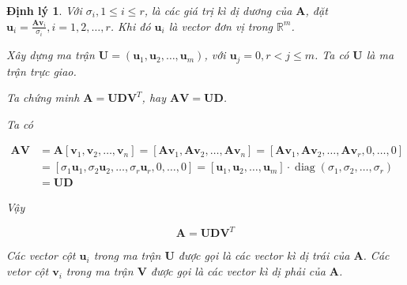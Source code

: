 \documentclass[12pt,a4paper,oneside]{report}
\newtheorem{dl}{Định lý}[section]
\numberwithin{equation}{section}
\begin{document}
\begin{dl}
Với $\sigma_{i}, 1 \leqslant i \leqslant r$, là các giá trị kì dị dương của $\mathbf{A}$, đặt $\mathbf{u}_{i}=\frac{\mathbf{A v}_{i}}{\sigma_{i}}, i=1,2, \ldots, r$. Khi đó $\mathbf{u}_{i}$ là vector đơn vị trong $\mathbb{R}^{m}$.

Xây dựng ma trận $\mathbf{U}=\left(\mathbf{u}_{1}, \mathbf{u}_{2}, \ldots, \mathbf{u}_{m}\right)$, với $\mathbf{u}_{j}=0, r<j \leqslant m$. Ta có $\mathbf{U}$ là ma trận trực giao.

Ta chứng minh $\mathbf{A}=\mathbf{U D V}^{T}$, hay $\mathbf{A V}=\mathbf{U D}$.

Ta có

$$
\begin{aligned}
	\mathbf{A} \mathbf{V} & =\mathbf{A}\left[\mathbf{v}_{1}, \mathbf{v}_{2}, \ldots, \mathbf{v}_{n}\right]=\left[\mathbf{A v}_{1}, \mathbf{A v}_{2}, \ldots, \mathbf{A} \mathbf{v}_{n}\right]=\left[\mathbf{A v}_{1}, \mathbf{A v}_{2}, \ldots, \mathbf{A v}_{r}, 0, \ldots, 0\right] \\
	& =\left[\sigma_{1} \mathbf{u}_{1}, \sigma_{2} \mathbf{u}_{2}, \ldots, \sigma_{r} \mathbf{u}_{r}, 0, \ldots, 0\right]=\left[\mathbf{u}_{1}, \mathbf{u}_{2}, \ldots, \mathbf{u}_{m}\right] \cdot \operatorname{diag}\left(\sigma_{1}, \sigma_{2}, \ldots, \sigma_{r}\right) \\
	& =\mathbf{U D}
\end{aligned}
$$

Vậy

$$
\mathbf{A}=\mathbf{U D V}^{T}
$$

Các vector cột $\mathbf{u}_{i}$ trong ma trận $\mathbf{U}$ được gọi là các vector kì dị trái của $\mathbf{A}$. Các vetor cột $\mathbf{v}_{i}$ trong ma trận $\mathbf{V}$ được gọi là các vector kì dị phải của $\mathbf{A}$.
\end{dl}
\end{document}
